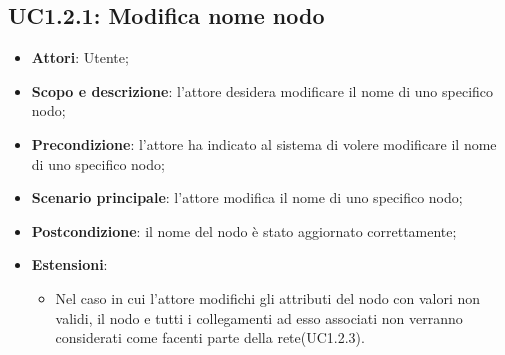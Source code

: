 \subsection{UC1.2.1: Modifica nome nodo} 
\hypertarget{UC1.2.1}{} 
\begin{itemize} 
	\item{\textbf{Attori}: Utente;} 
	\item{\textbf{Scopo e descrizione}: l'attore desidera modificare il nome di uno specifico nodo;} 
	\item{\textbf{Precondizione}: l'attore ha indicato al sistema di volere modificare il nome di uno specifico nodo;} 
	\item{\textbf{Scenario principale}: l'attore modifica il nome di uno specifico nodo;}
	\item{\textbf{Postcondizione}: il nome del nodo è stato aggiornato correttamente;}
	\item{\textbf{Estensioni}:} 
	\begin{itemize} 
		\item{Nel caso in cui l'attore modifichi gli attributi del nodo con valori non validi, il nodo e tutti i collegamenti ad esso associati non verranno considerati come facenti parte della rete(UC1.2.3).} 
	\end{itemize}  
\end{itemize} 
